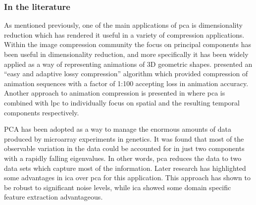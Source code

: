 %
%
%
%

\subsubsection{In the literature}
As mentioned previously, one of the main applications of \gls{pca} is dimensionality reduction which has rendered it useful in a variety of compression applications\citep{Vasilescu2003}\cite{Alexa2000}\linebreak[2]\cite{Zaeri2006}. Within the image compression community \citep{Vasilescu2003} the focus on principal components has been useful in dimensionality reduction, and more specifically it has been widely applied as a way of representing animations of 3D geometric shapes. \cite{Alexa2000} presented an ``easy and adaptive lossy compression'' algorithm which provided compression of animation sequences with a factor of 1:100 accepting loss in animation accuracy. Another approach to animation compression is presented in \cite{Karni2004} where \gls{pca} is combined with \gls{lpc} to individually focus on spatial and the resulting temporal components respectively.

PCA has been adopted as a way to manage the enormous amounts of data produced by microarray experiments in genetics\cite{Raychaudhuri2000}\cite{Saidi2004}. It was found that most of the observable variation in the data could be accounted for in just two components with a rapidly falling eigenvalues\cite{Raychaudhuri2000}. In other words, \gls{pca} reduces the data to two data sets which capture most of the information\cite{Raychaudhuri2000}. Later research has highlighted some advantages in \gls{ica} over \gls{pca} for this application\cite{Saidi2004}. This approach has shown to be robust to significant noise levels, while \gls{ica} showed some domain specific feature extraction advantageous.

